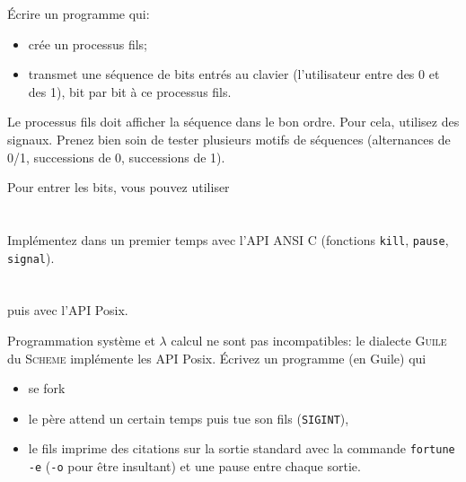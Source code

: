\documentclass{exam}
\begin{document}
\begin{questions}
    \question{}
    Écrire un programme qui:
    \begin{itemize}
      \item crée un processus fils;
      \item transmet une séquence de bits entrés au clavier (l'utilisateur entre
            des 0 et des 1), bit par bit à ce processus fils.
    \end{itemize}
    Le processus fils doit afficher la séquence dans le bon ordre. Pour cela,
    utilisez des signaux. Prenez bien soin de tester plusieurs motifs de
    séquences (alternances de 0/1, successions de 0, successions de 1).

    Pour entrer les bits, vous pouvez utiliser

    \begin{parts}
      \part{}
      Implémentez dans un premier temps avec l'API ANSI C
      (fonctions \texttt{kill}, \texttt{pause}, \texttt{signal}).
      \part{} puis avec l'API Posix.
    \end{parts}

  \question{}
  Programmation système et \(\lambda\) calcul ne sont pas incompatibles: le
  dialecte \textsc{Guile} du \textsc{Scheme} implémente les API Posix.
  Écrivez un programme (en Guile) qui
  \begin{itemize}
    \item se fork
    \item le père attend un certain temps puis tue son fils (\texttt{SIGINT}),
    \item le fils imprime des citations sur la sortie standard avec la commande
      \texttt{fortune -e} (\texttt{-o} pour être insultant) et une pause entre
      chaque sortie.
  \end{itemize}


\end{questions}
\end{document}
